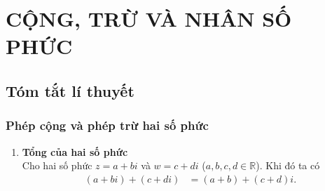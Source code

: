 \section{CỘNG, TRỪ VÀ NHÂN SỐ PHỨC}
\subsection{Tóm tắt lí thuyết}
\subsubsection{Phép cộng và phép trừ hai số phức}
\begin{enumerate}[\bf a)]
	\item \textbf{Tổng của hai số phức}\\
	Cho hai số phức $z=a+bi$ và $w=c + di$ ($a,b,c,d\in\mathbb{R}$). Khi đó ta có
	\begin{align*}
	(a+b i) + (c + di) &=(a+b) + (c+d) i.
	\end{align*}
	

\end{enumerate}
